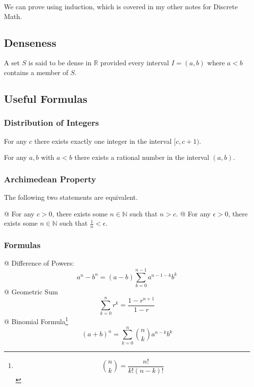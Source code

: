     We can prove using induction, which is covered in my other notes for Discrete Math.

    \subsection{Denseness}

    \begin{definition}[Dense]
        A set $S$ is said to be dense in $\mathbb{R}$ provided every interval $I = (a, b)$ where $a < b$ contains a
        member of $S$.
    \end{definition}

    \subsection{Useful Formulas}

        \subsubsection{Distribution of Integers}
        For any $c$ there exists exactly one integer in the interval $[c, c+1)$.

        For any $a, b$ with $a < b$ there exists a rational number in the interval $(a, b)$.

        \subsubsection{Archimedean Property}
        The following two statements are equivalent.

        \begin{easylist}[itemize]
            @ For any $c > 0$, there exists some $n \in \mathbb{N}$ such that $n > c$.
            @ For any $\epsilon > 0$, there exists some $n \in \mathbb{N}$ such that $\frac{1}{n} < \epsilon$.
        \end{easylist}

        \subsubsection{Formulas}
        \begin{easylist}[itemize]
            @ Difference of Powers:
            \[
                a^n - b^n = (a - b) \sum_{k = 0}^{n - 1} a^{n - 1 - k}b^k
            \]
            @ Geometric Sum
            \[
                \sum_{k = 0}^n r^k = \frac{1 - r^{n + 1}}{1 - r}
            \]
            @ Binomial Formula\footnote{\[ \binom{n}{k} = \frac{n!}{k!(n - k)!} \]}
            \[
                {(a + b)}^n = \sum_{k = 0}^n \binom{n}{k} a^{n - k} b^k
            \]
        \end{easylist}

